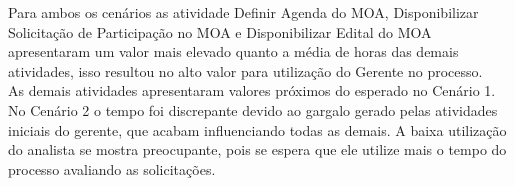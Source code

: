 Para ambos os cenários as atividade Definir Agenda do MOA, Disponibilizar Solicitação de Participação no MOA e Disponibilizar Edital do MOA apresentaram um valor mais elevado quanto a média de horas das demais atividades, isso resultou no alto valor para utilização do Gerente no processo.
\\ \indent As demais atividades apresentaram valores próximos do esperado no Cenário 1. No Cenário 2 o tempo foi discrepante devido ao gargalo gerado pelas atividades iniciais do gerente, que acabam influenciando todas as demais. A baixa utilização do analista se mostra preocupante, pois se espera que ele utilize mais o tempo do processo avaliando as solicitações.
